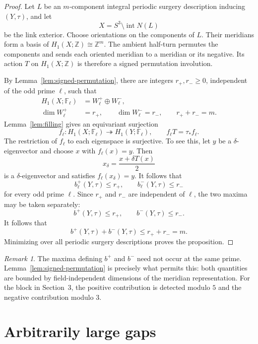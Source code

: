 \documentclass[11pt]{amsart}
\newcommand{\Int}{\operatorname{int}}
\newcommand{\F}{\mathbb{F}}
\newcommand{\Z}{\mathbb{Z}}
\theoremstyle{definition}
\theoremstyle{remark}
\newtheorem{remark}[theorem]{Remark}
\begin{document}
\begin{proof}
Let $L$ be an $m$-component integral periodic surgery description inducing $(Y,\tau)$, and let
\[
   X=S^3\setminus\Int N(L)
\]
be the link exterior. Choose orientations on the components of $L$. Their meridians form a basis of $H_1(X;\Z)\cong\Z^m$. The ambient half-turn permutes the components and sends each oriented meridian to a meridian or its negative. Its action $T$ on $H_1(X;\Z)$ is therefore a signed permutation involution.

By Lemma~\ref{lem:signed-permutation}, there are integers $r_+,r_-\geq0$, independent of the odd prime $\ell$, such that
\[
   \begin{aligned}
   H_1(X;\F_\ell)&=W^+_\ell\oplus W^-_\ell,\\
   \dim W^+_\ell&=r_+,
   \qquad
   \dim W^-_\ell=r_-,
   \qquad
   r_++r_-=m.
   \end{aligned}
\]
Lemma~\ref{lem:filling} gives an equivariant surjection
\[
   f_\ell\colon H_1(X;\F_\ell)\twoheadrightarrow H_1(Y;\F_\ell),
   \qquad
   f_\ell T=\tau_*f_\ell.
\]
The restriction of $f_\ell$ to each eigenspace is surjective. To see this, let $y$ be a $\delta$-eigenvector and choose $x$ with $f_\ell(x)=y$. Then
\[
   x_\delta=\frac{x+\delta T(x)}2
\]
is a $\delta$-eigenvector and satisfies $f_\ell(x_\delta)=y$. It follows that
\[
   b^+_\ell(Y,\tau)\leq r_+,
   \qquad
   b^-_\ell(Y,\tau)\leq r_-
\]
for every odd prime $\ell$. Since $r_+$ and $r_-$ are independent of $\ell$, the two maxima may be taken separately:
\[
   b^+(Y,\tau)\leq r_+,
   \qquad
   b^-(Y,\tau)\leq r_-.
\]
It follows that
\[
   b^+(Y,\tau)+b^-(Y,\tau)\leq r_++r_-=m.
\]
Minimizing over all periodic surgery descriptions proves the proposition.
\end{proof}

\begin{remark}\label{rem:different-primes}
The maxima defining $b^+$ and $b^-$ need not occur at the same prime. Lemma~\ref{lem:signed-permutation} is precisely what permits this: both quantities are bounded by field-independent dimensions of the meridian representation. For the block in Section~3, the positive contribution is detected modulo $5$ and the negative contribution modulo $3$.
\end{remark}

\section{Arbitrarily large gaps}
\end{document}
